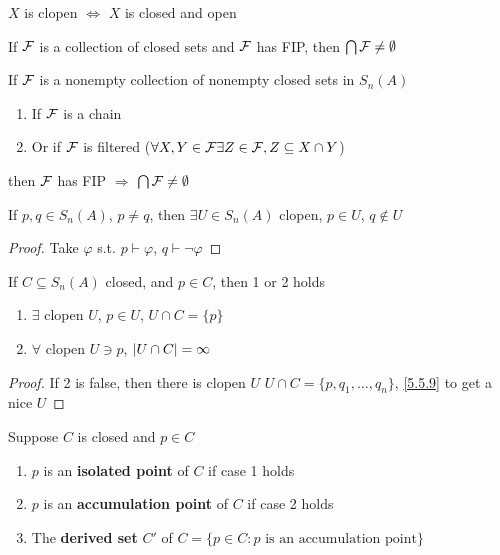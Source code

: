 \documentclass[11pt]{article}
\begin{document}
\begin{fact}[]
\(X\) is clopen \(\Leftrightarrow\) \(X\)   is closed and open
\end{fact}

\begin{fact}[]
If \(\mathcal{F}\) is a collection of closed sets and \(\mathcal{F}\) has FIP, then \(\bigcap\mathcal{F}\neq\emptyset\)
\end{fact}

\begin{corollary}[]
If \(\mathcal{F}\) is a nonempty collection of nonempty closed sets in \(S_n(A)\)
\begin{enumerate}
\item If \(\mathcal{F}\) is a chain
\item Or if \(\mathcal{F}\) is filtered (\(\forall X,Y\in\mathcal{F}\exists Z\in\mathcal{F},Z\subseteq X\cap Y\))
\end{enumerate}


then \(\mathcal{F}\) has FIP \(\Rightarrow\) \(\bigcap\mathcal{F}\neq\emptyset\)
\end{corollary}

\begin{proposition}
\label{5.5.9}
If \(p,q\in S_n(A)\), \(p\neq q\), then \(\exists U\in S_n(A)\) clopen, \(p\in U\), \(q\notin U\)
\end{proposition}

\begin{proof}
Take \(\varphi\) s.t. \(p\vdash\varphi\), \(q\vdash\neg\varphi\)
\end{proof}

\begin{proposition}[]
If \(C\subseteq S_n(A)\) closed, and \(p\in C\), then 1 or 2 holds
\begin{enumerate}
\item \(\exists\) clopen \(U\), \(p\in U\), \(U\cap C=\{p\}\)
\item \(\forall\) clopen \(U\ni p\), \(\abs{U\cap C}=\infty\)
\end{enumerate}
\end{proposition}

\begin{proof}
If 2 is false, then there is clopen \(U\) \(U\cap C=\{p,q_1,\dots,q_n\}\), \ref{5.5.9} to get a nice \(U\)
\end{proof}

\begin{definition}[]
Suppose \(C\) is closed and \(p\in C\)
\begin{enumerate}
\item \(p\) is an \textbf{isolated point} of \(C\) if  case 1 holds
\item \(p\) is an \textbf{accumulation point} of \(C\) if case 2 holds
\item The \textbf{derived set} \(C'\) of \(C=\{p\in C:p\text{ is an accumulation point}\}\)
\end{enumerate}
\end{definition}
\end{document}
